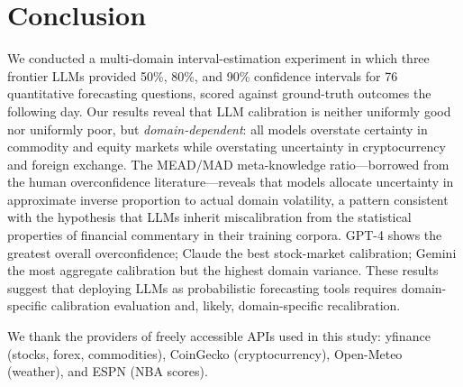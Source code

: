 \documentclass[9pt,twoside,lineno]{pnas-new}
\begin{document}
\section*{Conclusion}

We conducted a multi-domain interval-estimation experiment in which three frontier LLMs provided 50\%, 80\%, and 90\% confidence intervals for 76 quantitative forecasting questions, scored against ground-truth outcomes the following day. Our results reveal that LLM calibration is neither uniformly good nor uniformly poor, but \textit{domain-dependent}: all models overstate certainty in commodity and equity markets while overstating uncertainty in cryptocurrency and foreign exchange. The MEAD/MAD meta-knowledge ratio---borrowed from the human overconfidence literature---reveals that models allocate uncertainty in approximate inverse proportion to actual domain volatility, a pattern consistent with the hypothesis that LLMs inherit miscalibration from the statistical properties of financial commentary in their training corpora. GPT-4 shows the greatest overall overconfidence; Claude the best stock-market calibration; Gemini the most aggregate calibration but the highest domain variance. These results suggest that deploying LLMs as probabilistic forecasting tools requires domain-specific calibration evaluation and, likely, domain-specific recalibration.

\begin{acknowledgments}
We thank the providers of freely accessible APIs used in this study: yfinance (stocks, forex, commodities), CoinGecko (cryptocurrency), Open-Meteo (weather), and ESPN (NBA scores).
\end{acknowledgments}


\end{document}
